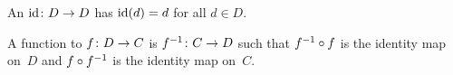 \documentclass{ibl}  %
\begin{document}
\begin{problem}

\end{problem}

\begin{df}
An  $\mbox{$\operatorname{id}\colon D\to D$}$ has
$\operatorname{id}(d)=d$ for all $d\in D$.
\end{df}

\begin{df}
A function  to $\mbox{$f\colon D\to C$}$ is 
$\mbox{$f^{-1}\colon C\to D$}$ such that 
$f^{-1}\mathbin{\circ} f$ is the identity map on~$D$ and
$f\mathbin{\circ} f^{-1}$ is the identity map on~$C$.
\end{df}
\end{document}
